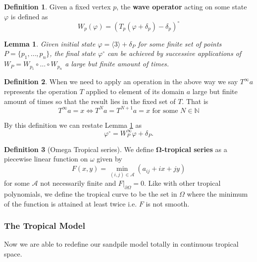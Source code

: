 \documentclass[12pt,a4paper]{amsart}
\newcommand{\N}{\mathbb{N}}
\newtheorem{lem}[thm]{Lemma}
\theoremstyle{definition}
\newtheorem{defn}{Definition}[section]
\theoremstyle{remark}
\begin{document}
\begin{defn}
Given a fixed vertex $p$, the \textbf{wave operator} acting on some state $\varphi$ is defined as
\begin{equation}
    W_p(\varphi) = (T_p(\varphi+\delta_p)-\delta_p)^\circ
\end{equation}
\end{defn}

\begin{lem}\label{waveFinalState}
Given initial state $\varphi = \langle 3 \rangle + \delta_P$ for some finite set of points $P = \{p_1,\dots,p_n\}$, the final state $\varphi^\circ$ can be achieved by successive applications of $W_P = W_{p_1}\circ\dots\circ W_{p_n}$ a large but finite amount of times.
\end{lem}

\begin{defn}
When we need to apply an operation in the above way we say $T^\infty a$ represents the operation $T$ applied to element of its domain $a$ large but finite amount of times so that the result lies in the fixed set of $T$. That is
\begin{equation}
    T^\infty a = x \iff T^Na=T^{N+1}a=x\text{ for some }N\in\N
\end{equation}
\end{defn}

By this definition we can restate Lemma \ref{waveFinalState} as
\begin{equation}
    \varphi^\circ = W_P^\infty\varphi + \delta_P.
\end{equation}

\begin{defn}[Omega Tropical series]
We define \textbf{$\boldsymbol{\Omega}$-tropical series} as a piecewise linear function on $\omega$ given by
\begin{equation}
    F(x,y) = \min_{(i,j)\in\mathcal{A}}(a_{ij}+ix+jy)
\end{equation}
for some $\mathcal{A}$ not necessarily finite and $F|_{\partial\Omega} = 0$. Like with other tropical polynomials, we define the tropical curve to be the set in $\Omega$ where the minimum of the function is attained at least twice i.e. $F$ is not smooth.

\end{defn}

\subsubsection{The Tropical Model}

Now we are able to redefine our sandpile model totally in continuous tropical space.

\newpage
\printbibliography
\newpage

\end{document}
